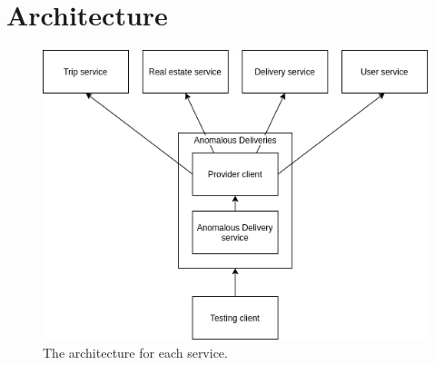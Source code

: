 \section{Architecture}
\begin{figure}
    \centerline{\includegraphics[scale=0.5]{thesis_svava/images/architecture.png}}
    \caption{The architecture for each service.}
    \label{fig:architecture}
\end{figure}

